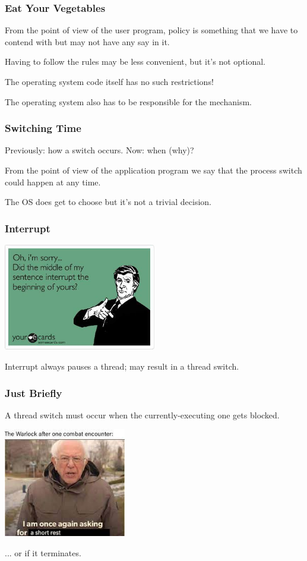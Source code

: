 \begin{frame}
\frametitle{Eat Your Vegetables}

From the point of view of the user program, policy is something that we have to contend with but may not have any say in it.

Having to follow the rules may be less convenient, but it's not optional.

The operating system code itself has no such restrictions!

The operating system also has to be responsible for the mechanism.

\end{frame}

\begin{frame}
\frametitle{Switching Time}

Previously: how a switch occurs. Now: when (why)?

From the point of view of the application program we say that the process switch could happen at any time.

The OS does get to choose but it's not a trivial decision.

\end{frame}

\begin{frame}
\frametitle{Interrupt}

\begin{center}
	\includegraphics[width=0.5\textwidth]{images/interrupt.jpg}
\end{center}

Interrupt always pauses a thread; may result in a thread switch.


\end{frame}

\begin{frame}
\frametitle{Just Briefly}

A thread switch must occur when the currently-executing one gets blocked.

\begin{center}
	\includegraphics[width=0.4\textwidth]{images/shortrest.jpg}
\end{center}

... or if it terminates.

\end{frame}

